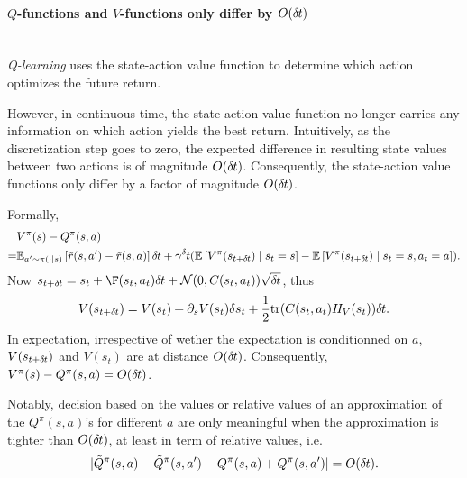 
\paragraph{$Q$-functions and $V$-functions only differ by $O (\delta\hspace{-.06em}t)$}~\\
\label{sec:QContinuous}
\emph{Q-learning} uses the state-action value function to determine which
action optimizes the future return.

However, in continuous time, the state-action value function no longer carries
any information on which action yields the best return. Intuitively, as the
discretization step goes to zero, the expected difference in resulting state
values between two actions is of magnitude $O (\delta\hspace{-.06em}t)$. Consequently, the
state-action value functions only differ by a factor of magnitude
$O (\delta\hspace{-.06em}t)$.

Formally,
\begin{align}
	&V^\pi(s) - Q^\pi(s, a)\\ 
	= &\BE_{a'\sim \pi(\cdot\mid s)}
	\left[\tilde{r}(s, a') - \tilde{r}(s, a)\right] \deltat
	+
	\gamma^\deltat 
	(\BE\left[V^\pi(s_{t+\deltat}) \mid s_t=s\right]
	-
	\BE\left[V^\pi(s_{t+\deltat}) \mid s_t=s, a_t=a\right]).\nonumber
\end{align}
Now $s_{t + \deltat} = s_t + \F(s_t, a_t) \deltat +
\gauss(0, C(s_t, a_t)) \sqrt{\deltat}$, thus 
\begin{equation}
	V(s_{t+\delta\hspace{-.06em}t}) = V(s_t) + \partial_s V(s_t) \delta s_t
	+ \frac{1}{2}\mathrm{tr}(C(s_t, a_t) H_V(s_t))\delta\hspace{-.06em}t.
\end{equation}
In expectation, irrespective of wether the expectation is conditionned on $a$,
$V(s_{t+\delta\hspace{-.06em}t})$ and $V(s_t)$ are at distance $O (\delta\hspace{-.06em}t)$. Consequently,
$V^\pi(s) - Q^\pi(s, a) = O (\delta\hspace{-.06em}t)$.

Notably, decision based on the values or relative values of an approximation of
the $Q^\pi(s, a)$'s for different $a$ are only meaningful when the
approximation is tighter than $O (\delta\hspace{-.06em}t)$, at least in term of relative
values, i.e.  
\begin{equation*}
	|\tilde{Q}^\pi(s, a) - \tilde{Q}^\pi(s, a') - Q^\pi(s, a) +
	Q^\pi(s, a')| = O (\delta\hspace{-.06em}t).
\end{equation*}

